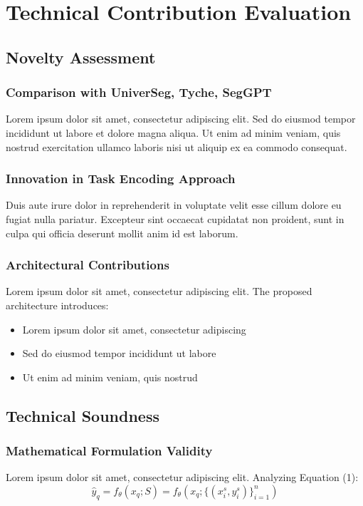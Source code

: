 \section{Technical Contribution Evaluation}
\label{sec:technical_contribution}

\subsection{Novelty Assessment}
\subsubsection{Comparison with UniverSeg, Tyche, SegGPT}
Lorem ipsum dolor sit amet, consectetur adipiscing elit. Sed do eiusmod tempor incididunt ut labore et dolore magna aliqua. Ut enim ad minim veniam, quis nostrud exercitation ullamco laboris nisi ut aliquip ex ea commodo consequat.

\subsubsection{Innovation in Task Encoding Approach}
Duis aute irure dolor in reprehenderit in voluptate velit esse cillum dolore eu fugiat nulla pariatur. Excepteur sint occaecat cupidatat non proident, sunt in culpa qui officia deserunt mollit anim id est laborum.

\subsubsection{Architectural Contributions}
Lorem ipsum dolor sit amet, consectetur adipiscing elit. The proposed architecture introduces:
\begin{itemize}
    \item Lorem ipsum dolor sit amet, consectetur adipiscing
    \item Sed do eiusmod tempor incididunt ut labore
    \item Ut enim ad minim veniam, quis nostrud
\end{itemize}

\subsection{Technical Soundness}
\subsubsection{Mathematical Formulation Validity}
Lorem ipsum dolor sit amet, consectetur adipiscing elit. Analyzing Equation (1):
\begin{equation}
    \hat{y}_q = f_\theta(x_q; S) = f_\theta(x_q; \{(x_i^s, y_i^s)\}_{i=1}^n)
\end{equation}

